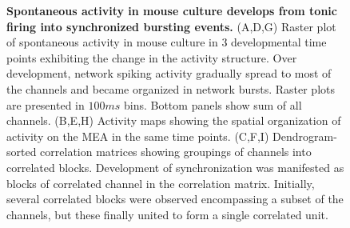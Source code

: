 \begin{figure}[!htb]
            \caption[Development of synchrony in the spontaneous activity of a representative mouse culture]{\textbf{Spontaneous activity in mouse culture develops from tonic firing into synchronized bursting events.} (A,D,G) Raster plot of spontaneous activity in mouse culture in 3 developmental time points exhibiting the change in the activity structure. Over development, network spiking activity gradually spread to most of the channels and became organized in network bursts. Raster plots are presented in \(100 ms\) bins. Bottom panels show sum of all channels. (B,E,H) Activity maps showing the spatial organization of activity on the MEA in the same time points. (C,F,I) Dendrogram- sorted correlation matrices showing groupings of channels into correlated blocks. Development of synchronization was manifested as blocks of correlated channel in the correlation matrix. Initially, several  correlated blocks were observed encompassing a subset of the channels, but these finally united to form a single correlated unit.}
            \label{fig:activity:devExample}
        \end{figure}



